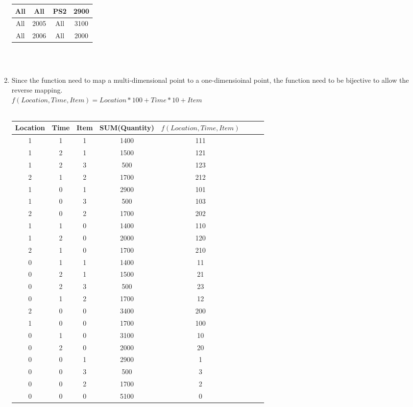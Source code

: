 \documentclass[a4paper]{scrartcl}
\begin{document}
\begin{enumerate}[label=\arabic*)]
\begin{tabular}{ c |c | c | c }
    \hline
    All & All & PS2 & 2900 \\
    \hline
    All & 2005 & All & 3100 \\
    \hline
    All & 2006 & All & 2000 \\
    \hline
\end{tabular}\\
\\
\item Since the function need to map a multi-dimensional point to a one-dimensioinal point, the function need to be bijective to allow the reverse mapping. \\
$f(Location,Time,Item) = Location*100+Time*10+Item$\\
\pagebreak
\\
\begin{tabular}{c  c  c  c c c | c| c}
  \hline Location & Time & Item & SUM(Quantity) & $f(Location,Time,Item)$  \\
  \hline 1 & 1 & 1 & 1400 & 111\\
  \hline 1 & 2 & 1 & 1500 & 121\\
  \hline 1 & 2 & 3 & 500 & 123\\
  \hline 2 & 1 & 2 & 1700 & 212\\
  \hline 1 & 0 & 1 & 2900 & 101\\
  \hline 1 & 0 & 3 & 500 & 103\\
  \hline 2 & 0 & 2 & 1700 & 202\\
  \hline 1 & 1 & 0 & 1400 & 110\\
  \hline 1 & 2 & 0 & 2000 & 120\\
  \hline 2 & 1 & 0 & 1700 & 210\\
  \hline 0 & 1 & 1 & 1400 & 11\\
  \hline 0 & 2 & 1 & 1500 & 21\\
  \hline 0 & 2 & 3 & 500 & 23\\
  \hline 0 & 1 & 2 & 1700 & 12\\
  \hline 2 & 0 & 0 & 3400 & 200\\
  \hline 1 & 0 & 0 & 1700 & 100\\
  \hline 0 & 1 & 0 & 3100 & 10\\
  \hline 0 & 2 & 0 & 2000 & 20\\
  \hline 0 & 0 & 1 & 2900 & 1\\
  \hline 0 & 0 & 3 & 500 & 3\\
  \hline 0 & 0 & 2 & 1700 & 2\\
  \hline 0 & 0 & 0 & 5100 & 0\\
  \hline
\end{tabular}\\

\end{enumerate}
\end{document}
